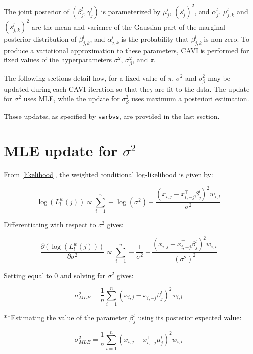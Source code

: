 \documentclass[twoside]{article}
\newcommand{\1}{\\[1ex]}
\newcommand{\2}{\\[2ex]}
\newcommand{\3}{\\[3ex]}
\newcommand{\4}{\\[4ex]}
\begin{document}
The joint posterior of $(\beta_j^l,\gamma_j^l)$ is parameterized by $\mu_j^l$, $(s_j^l)^2$, and $\alpha^l_j$. $\mu_{j,k}^l$ and $(s_{j,k}^l)^2$ are the mean and variance of the Gaussian part of the marginal posterior distribution of $\beta_{j,k}^l$, and $\alpha_{j,k}^l$ is the probability that $\beta_{j,k}^l$ is non-zero. To produce a variational approximation to these parameters, CAVI is performed for fixed values of the hyperparameters $\sigma^2$, $\sigma^2_\beta$, and $\pi$.

The following sections detail how, for a fixed value of $\pi$, $\sigma^2$ and $\sigma^2_\beta$ may be updated during each CAVI iteration so that they are fit to the data. The update for $\sigma^2$ uses MLE, while the update for $\sigma^2_\beta$ uses maximum a posteriori estimation. 

These updates, as specified by \texttt{varbvs}, are provided in the last section. 

\section{MLE update for $\sigma^2$}

From \eqref{likelihood}, the weighted conditional log-likelihood is given by: 

\begin{equation}
\log(L_l^w(j))\propto \sum_{i = 1}^n -\log(\sigma^2) - \frac{(x_{i,j} - x^\top_{i,-j}\beta_j^l)^2w_{i,l}}{\sigma^2}
\end{equation}

Differentiating with respect to $\sigma^2$ gives:

\begin{equation}
\frac{\partial(\log(L_l^w(j)))}{\partial\sigma^2} \propto \sum_{i = 1}^n - \frac{1}{\sigma^2} + \frac{(x_{i,j} - x^\top_{i,-j}\beta_j^l)^2w_{i,l}}{(\sigma^2)^2}
\end{equation}

Setting equal to 0 and solving for $\sigma^2$ gives:

\begin{equation}
\sigma^2_{\textit{MLE}} = \frac1{n}\sum_{i = 1}^n (x_{i,j} - x^\top_{i,-j}\beta_j^l)^2w_{i,l}
\end{equation}

**Estimating the value of the parameter $\beta_j^l$ using its posterior expected value: 

\begin{equation}
\sigma^2_{\textit{MLE}} = \frac1{n}\sum_{i = 1}^n (x_{i,j} - x^\top_{i,-j}\mu_j^l)^2w_{i,l}
\end{equation}
\end{document}
